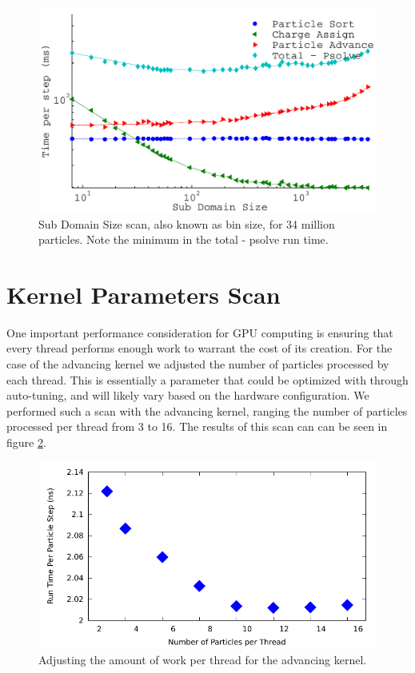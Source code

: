 \begin{figure}[H]
\begin{center}
\includegraphics[width=6in]{performance/gridshape_scan.pdf}
\end{center}
\caption{Sub Domain Size scan, also known as bin size, for 34 million particles. Note the minimum in the total - psolve run time.}
\label{fig:subdomain_size_scan}
\end{figure}


	\section{Kernel Parameters Scan}
One important performance consideration for GPU computing is ensuring that every thread performs enough work to warrant the cost of its creation. For the case of the advancing kernel we adjusted the number of particles processed by each thread. This is essentially a parameter that could be optimized with through auto-tuning, and will likely vary based on the hardware configuration. We performed such a scan with the advancing kernel, ranging the number of particles processed per thread from 3 to 16. The results of this scan can can be seen in figure \ref{fig:kernel_param_scan}.

\begin{figure}[H]
\begin{center}
\includegraphics[width=6in]{performance/kernel_param.pdf}
\end{center}
\caption{Adjusting the amount of work per thread for the advancing kernel.}
\label{fig:kernel_param_scan}
\end{figure}

